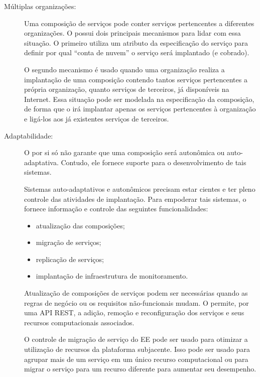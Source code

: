 \begin{description}
\item [Múltiplas organizações:]

Uma composição de serviços pode conter serviços pertencentes a diferentes organizações.
O \ee possui dois principais mecanismos para lidar com essa situação.
O primeiro utiliza um atributo da especificação do serviço para definir
por qual ``conta de nuvem'' o serviço será implantado (e cobrado).

O segundo mecanismo é usado quando uma organização realiza a implantação
de uma composição contendo tantos serviços pertencentes a própria organização,
quanto serviços de terceiros, já disponíveis na Internet.
Essa situação pode ser modelada na especificação da composição,
de forma que o \ee irá implantar apenas os serviços pertencentes à organização
e ligá-los aos já existentes serviços de terceiros.

\item [Adaptabilidade:]

O \ee por si só não garante que uma composição será autonômica ou auto-adaptativa.
Contudo, ele fornece suporte para o desenvolvimento de tais sistemas.

Sistemas auto-adaptativos e autonômicos precisam estar cientes
e ter pleno controle das atividades de implantação.
Para empoderar tais sistemas, o \choreos \ee fornece informação e controle
das seguintes funcionalidades:

\begin{itemize}
\item atualização das composições;
\item migração de serviços;
\item replicação de serviços;
\item implantação de infraestrutura de monitoramento.
\end{itemize}

Atualização de composições de serviços podem ser necessárias quando
as regras de negócio ou os requisitos não-funcionais mudam.
O \ee permite, por uma API REST, a adição, remoção e reconfiguração dos serviços
e seus recursos computacionais associados.

O controle de migração de serviço do EE pode ser usado para otimizar
a utilização de recursos da plataforma subjacente.
Isso pode ser usado para agrupar mais de um serviço em um único
recurso computacional ou para migrar o serviço para um recurso diferente
para aumentar seu desempenho.


\end{description}
